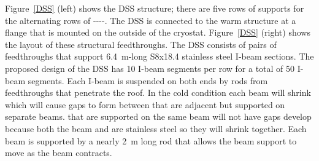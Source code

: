 Figure~\ref{DSS} (left) shows the DSS structure; there are five rows
of supports for the alternating rows
of ----.  The
DSS is connected to the warm structure at a flange that is mounted on
the outside of the cryostat.  Figure~\ref{DSS} (right) shows the
layout of these structural feedthroughs.  The DSS consists of pairs of
feedthroughs that support \SI{6.4}{m}-long S8x18.4 stainless steel I-beam
sections. The proposed design of the DSS has \num{10} I-beam segments per
row for a total of \num{50} I-beam segments. Each I-beam is suspended on
both ends by rods from feedthroughs that penetrate the roof.  In the
cold condition each beam will shrink which will cause gaps to form
between  that are adjacent but supported on separate
beams.   that are supported on the same beam will not have
gaps develop because both the beam and  are stainless
steel so they will shrink together.  Each beam is supported by a
nearly \SI{2}{m} long rod that allows the beam support to move as the beam
contracts.

